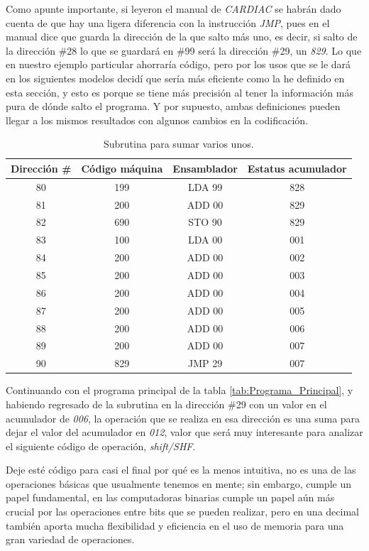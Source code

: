\documentclass[letterpaper,12pt,oneside]{book}
\begin{document}
	Como apunte importante, si leyeron el manual
	de \textit{CARDIAC} se habrán dado cuenta de que hay una ligera diferencia con la instrucción \textit{JMP}, pues en el manual dice que guarda la dirección
	de la que salto más uno, es decir, si salto de la dirección \#28 lo que se guardará en \#99 será la dirección \#29, un \textit{829}. Lo que en nuestro
	ejemplo particular ahorraría código, pero por los usos que se le dará en los siguientes modelos decidí que sería más eficiente como la he definido en esta sección, y esto
	es porque se tiene más precisión al tener la información más pura de dónde salto el programa. Y por supuesto, ambas definiciones pueden llegar a los
	mismos resultados con algunos cambios en la codificación.
	
	\begin{table}[h]
	  \centering
	  \begin{tabular}{|c|c|c|c|}
	    \hline
    	\textbf{Dirección \#} & \textbf{Código máquina} & \textbf{Ensamblador} & \textbf{Estatus acumulador} \\
	    \hline
	     80 & 199 & LDA 99 & 828 \\
	     81 & 200 & ADD 00 & 829 \\
	     82 & 690 & STO 90 & 829 \\
	     83 & 100 & LDA 00 & 001 \\
	     84 & 200 & ADD 00 & 002 \\
	     85 & 200 & ADD 00 & 003 \\
	     86 & 200 & ADD 00 & 004 \\
	     87 & 200 & ADD 00 & 005 \\
	     88 & 200 & ADD 00 & 006 \\
	     89 & 200 & ADD 00 & 007 \\
	     90 & 829 & JMP 29 & 007 \\
	    \hline
	  \end{tabular}
	  \caption{Subrutina para sumar varios unos.}
	  \label{tab:subrutina}
	\end{table}
	
	
	Continuando con el programa principal de la tabla \ref{tab:Programa_Principal}, y habiendo regresado de la subrutina en
	la dirección \#29 con
	un valor en el acumulador de \textit{006}, la operación que se
 realiza en esa dirección es una suma para dejar
 el valor del acumulador en \textit{012}, valor que será muy
	interesante para analizar el siguiente código de operación, \textit{shift/SHF}.
 
    Deje esté código para  casi el final 	
	por qué
	es la menos intuitiva, no es una de las operaciones básicas que usualmente tenemos en mente; sin embargo, cumple un papel fundamental, en las 
	computadoras binarias cumple un papel aún más crucial por las operaciones entre bits que se pueden realizar, pero en una decimal
	también aporta mucha flexibilidad y eficiencia en el uso de memoria para una gran variedad de operaciones.
	
\end{document}
